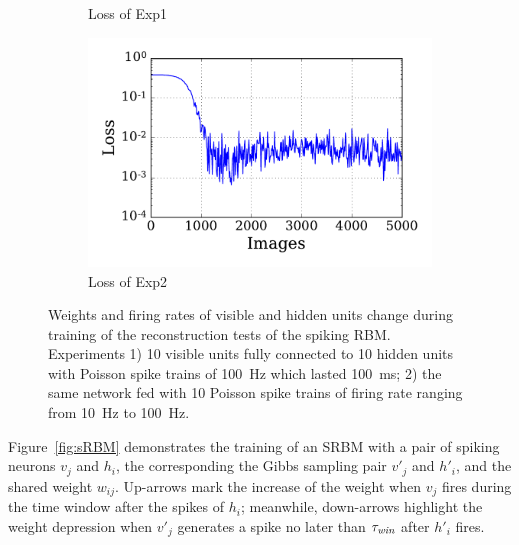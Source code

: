 \begin{figure}
\begin{subfigure}[t]{0.48\textwidth}
		\caption{Loss of Exp1}
	\end{subfigure}
	\begin{subfigure}[t]{0.48\textwidth}
		\includegraphics[width=\textwidth]{pics_sdlm/10_exp_SRBM_Orig/exp2_mse_nons.pdf}
		\caption{Loss of Exp2}
	\end{subfigure}
	\caption[SRBM training of the reconstruction tests.]{Weights and firing rates of visible and hidden units change during training of the reconstruction tests of the spiking RBM. 
		Experiments 1) 10 visible units fully connected to 10 hidden units with Poisson spike trains of 100~Hz which lasted 100~ms; 2) the same network fed with 10 Poisson spike trains of firing rate ranging from 10~Hz to 100~Hz.}
	\label{fig:srbm_orig}
\end{figure}

Figure~\ref{fig:sRBM} demonstrates the training of an SRBM with a pair of spiking neurons $v_j$ and $h_i$, the corresponding \DIFdelbegin {}\DIFdelend the Gibbs sampling pair $v'_j$ and $h'_i$, and the shared weight $w_{ij}$.
Up-arrows mark the increase of the weight when $v_j$ fires during the time window after the spikes of $h_i$;
meanwhile, down-arrows highlight	 the weight depression when $v'_j$ generates a spike no later than $\tau_{\textit{\textrm{win}}}$ after $h'_i$ fires.







